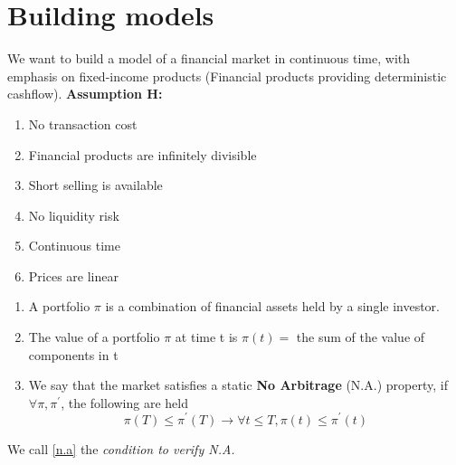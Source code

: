 \section{Building models} 
We want to build a model of a financial market in continuous time, with emphasis on fixed-income products (Financial
products providing deterministic cashflow). 
\textbf{Assumption H:}
\begin{enumerate}
 \item No transaction cost
\item Financial products are infinitely divisible
\item Short selling is available 
\item No liquidity risk 
\item Continuous time
\item Prices are linear
\end{enumerate}
\begin{dfn}
\begin{enumerate}
 \item A portfolio $\pi$ is a combination of financial assets held by a single investor. 
\item The value of a portfolio $\pi$ at time t is $\pi(t) =$ the sum of the value of components in t
\item We say that the market satisfies a static \textbf{No Arbitrage} (N.A.) property, if $\forall \pi, \pi^{'}$, the
following are held 
\begin{equation}\label{n.a}
 \pi(T) \leq \pi^{'}(T) \to \forall t \leq T, \pi(t) \leq \pi^{'}(t)
\end{equation}

\end{enumerate}

\end{dfn}
We call \ref{n.a} the \textit{condition to verify N.A.} 

